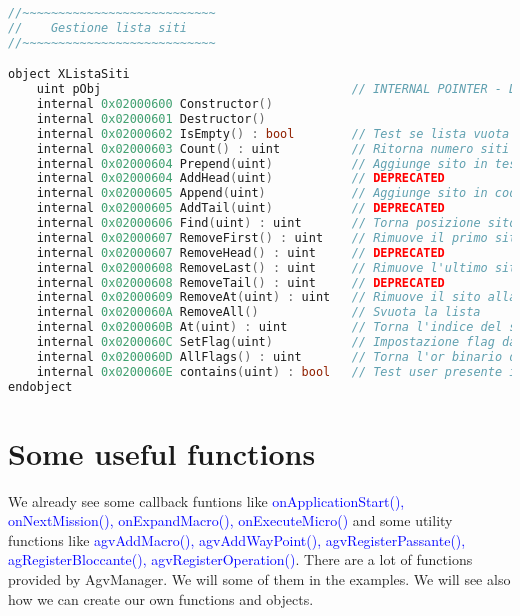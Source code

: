 \begin{lstlisting}[language=c++,caption= XListaSiti, label= lstXListaSiti]
//~~~~~~~~~~~~~~~~~~~~~~~~~~~
//    Gestione lista siti    
//~~~~~~~~~~~~~~~~~~~~~~~~~~~

object XListaSiti
	uint pObj									// INTERNAL POINTER - DO NOT TOUCH
	internal 0x02000600 Constructor()
	internal 0x02000601 Destructor()
	internal 0x02000602 IsEmpty() : bool		// Test se lista vuota
	internal 0x02000603 Count() : uint			// Ritorna numero siti in lista
	internal 0x02000604 Prepend(uint)			// Aggiunge sito in testa alla lista
	internal 0x02000604 AddHead(uint)			// DEPRECATED
	internal 0x02000605 Append(uint)			// Aggiunge sito in coda alla lista
	internal 0x02000605 AddTail(uint)			// DEPRECATED
	internal 0x02000606 Find(uint) : uint		// Torna posizione sito in lista (-1 se non trovato)
	internal 0x02000607 RemoveFirst() : uint	// Rimuove il primo sito dalla lista, e ne torna il valore
	internal 0x02000607 RemoveHead() : uint		// DEPRECATED
	internal 0x02000608 RemoveLast() : uint		// Rimuove l'ultimo sito dalla lista, e ne torna il valore
	internal 0x02000608 RemoveTail() : uint		// DEPRECATED
	internal 0x02000609 RemoveAt(uint) : uint	// Rimuove il sito alla posizione specificata (ritorna l'indice del sito rimosso)
	internal 0x0200060A RemoveAll()				// Svuota la lista
	internal 0x0200060B At(uint) : uint			// Torna l'indice del sito alla posizione specificata
	internal 0x0200060C SetFlag(uint)			// Impostazione flag da settare per tutti i siti in lista
	internal 0x0200060D AllFlags() : uint		// Torna l'or binario dei flags di tutti i siti in lista
	internal 0x0200060E contains(uint) : bool	// Test user presente in lista
endobject
\end{lstlisting}
	
%
\section{Some useful functions}
We already see some callback funtions like \textcolor{blue}{onApplicationStart(), onNextMission(), onExpandMacro(), onExecuteMicro()} and some utility functions like \textcolor{blue}{agvAddMacro(), agvAddWayPoint(), agvRegisterPassante(), agRegisterBloccante(), agvRegisterOperation()}. There are a lot of functions provided by AgvManager. We will some of them in the examples. We will see also how we can create our own functions and objects.

